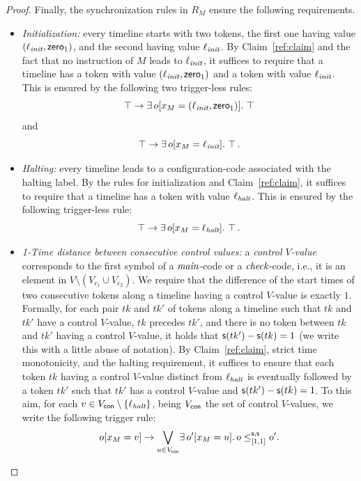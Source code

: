 \begin{proof}
Finally, the synchronization rules in $R_M$ ensure the following requirements.
%
 \begin{itemize}
   \item \emph{Initialization:} every timeline starts with two tokens, the first one having value
   $(\ell_{\textit{init}},{\mathsf{zero}}_1)$, and the second having value $\ell_{\textit{init}}$. By Claim~\ref{ref:claim} and the fact that no instruction
   of $M$ leads to $\ell_{\textit{init}}$, it suffices to require that a timeline has a token with value $(\ell_{\textit{init}},{\mathsf{zero}}_1)$ and a token with value
   $\ell_{\textit{init}}$.
   This is ensured by the following two trigger-less rules:
   \[
   \operatorname{\top} \rightarrow \exists \, o[x_M=(\ell_{\textit{init}},{\mathsf{zero}}_1)].\, \operatorname{\top}
   \] and \[
   \operatorname{\top} \rightarrow \exists \, o[x_M= \ell_{\textit{init}}].\, \operatorname{\top}
   .\]
   \item \emph{Halting:} every timeline leads to a configuration-code associated with the halting label. By the rules for initialization and Claim~\ref{ref:claim}, it suffices to require that a timeline has a token with value $\ell_{\textit{halt}}$. This is ensured by the following trigger-less rule:
   \[
   \operatorname{\top} \rightarrow \exists \, o[x_M=\ell_{\textit{halt}}].\, \operatorname{\top}
   .\]
   \item \emph{1-Time distance between consecutive control values:} a \emph{control $V$-value} corresponds to the first symbol of a ${\textit{main}}$-code or a ${\textit{check}}$-code, i.e., it is an element in $V\setminus (V_{c_1}\cup V_{c_2})$. We require  that the difference of the start times of two consecutive tokens along a timeline having a control $V$-value is exactly $1$. Formally, 
    for each pair $tk$ and $tk'$ of tokens along a timeline such that $tk$ and $tk'$ have a control $V$-value, $tk$ precedes $tk'$, and there is no token between $tk$ and $tk'$ having a control $V$-value, it holds that $\mathsf{s}(tk')-\mathsf{s}(tk)=1$ (we write this with a little abuse of notation). By Claim~\ref{ref:claim}, strict time monotonicity, and the halting requirement, it suffices to ensure that each token $tk$ having a control $V$-value distinct from $\ell_{\textit{halt}}$ is eventually followed by a token $tk'$ such that $tk'$ has a control $V$-value and $\mathsf{s}(tk')-\mathsf{s}(tk)=1$. To this aim, for each  $v\in V_{\mathsf{con}}\setminus \{\ell_{\textit{halt}}\}$, being $V_{\mathsf{con}}$ the set of control $V$-values,  we write the following trigger rule:
   \[
   o[x_M=v] \rightarrow \displaystyle{\bigvee_{u\in V_{\mathsf{con}}}} \exists\, o'[x_M= u].\, o\leq^{\mathsf{s},\mathsf{s}}_{[1,1]} o'. 
   \]
   

\end{itemize}
\end{proof}
